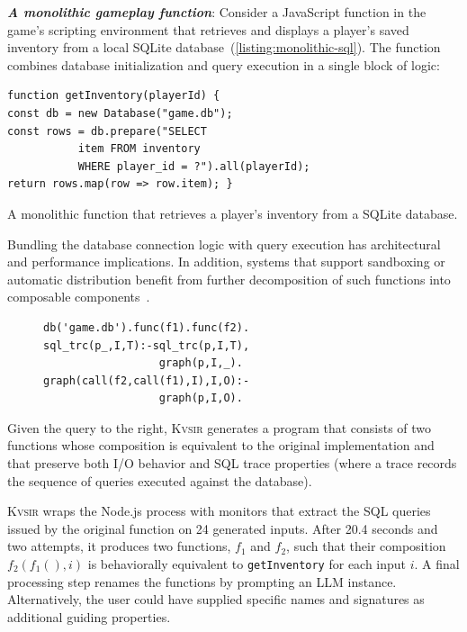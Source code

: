 \documentclass[sigplan,review,anonymous,10pt]{acmart}
\newcommand{\sys}{{\scshape Kv{\textalpha}sir}\xspace}
\newcommand{\heading}[1]{\vspace{2pt}\noindent\textbf{\emph{#1}}:\enspace}
\begin{document}
\heading{A monolithic gameplay function}
Consider a JavaScript function in the game's scripting environment that
retrieves and displays a player's saved inventory from a local SQLite database~(\cref{listing:monolithic-sql}).
The function combines database initialization and query execution in a single
block of logic:

\begin{listing}
\begin{verbatim}
function getInventory(playerId) {
const db = new Database("game.db");
const rows = db.prepare("SELECT
           item FROM inventory
           WHERE player_id = ?").all(playerId);
return rows.map(row => row.item); }
\end{verbatim}
\caption{A monolithic function that retrieves a player's inventory from a SQLite database.}
\label{listing:monolithic-sql}
\end{listing}

Bundling the database connection logic with query execution has architectural
and performance implications. In addition, systems that support sandboxing or
automatic distribution benefit from further decomposition of such functions
into composable components~\cite{Towards_Modern_Ghemaw_2023, vasilakis2019ignis, vasilakis2018breakapp}.

\begin{figure}
  \begin{verbatim}
db('game.db').func(f1).func(f2).
sql_trc(p_,I,T):-sql_trc(p,I,T),
                  graph(p,I,_).
graph(call(f2,call(f1),I),I,O):-
                  graph(p,I,O).
  \end{verbatim}
\end{figure}

Given the query to the right, \sys generates a program that consists of two
functions whose composition is equivalent to the original implementation and
that preserve both I/O behavior and SQL trace properties (where a trace records
the sequence of queries executed against the database).

\sys wraps the Node.js process with monitors that extract the SQL queries
issued by the original function on 24 generated inputs.
After 20.4 seconds and
two attempts, it produces two functions, $f_1$ and $f_2$, such that their
composition $f_2(f_1(), i)$ is behaviorally equivalent to \texttt{getInventory}
for each input $i$.
A final processing step renames the functions by prompting
an LLM instance.
Alternatively, the user could have supplied specific names and
signatures as additional guiding properties.
\end{document}
